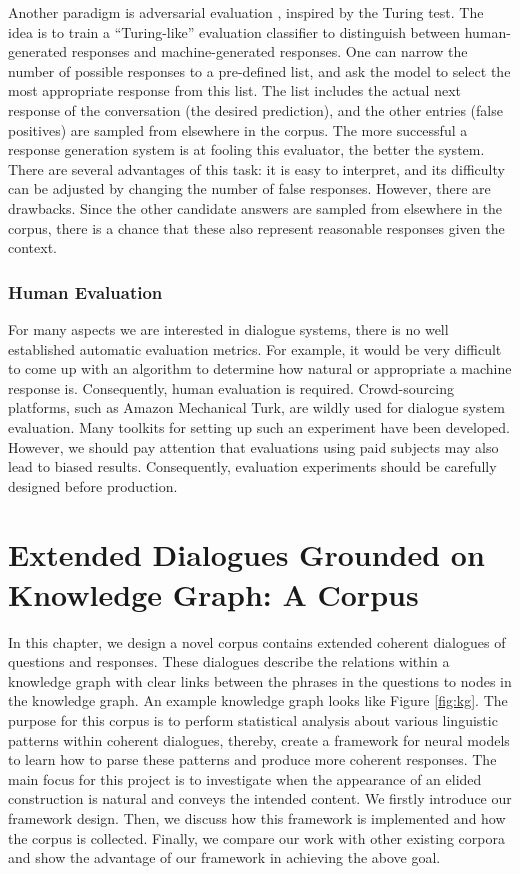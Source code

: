 \documentclass[bsc,frontabs,twoside,singlespacing,parskip,deptreport]{infthesis}     %
\begin{document}
Another paradigm is adversarial evaluation \cite{bowman2015generating,kannan2017adversarial,li2017adversarial}, inspired by the Turing test. The idea is to train a “Turing-like” evaluation classifier to distinguish between human-generated responses and machine-generated responses. One can narrow the number of possible responses to a pre-defined list, and ask the model to select the most appropriate response from this list. The list includes the actual next response of the conversation (the desired prediction), and the other entries (false positives) are sampled from elsewhere in the corpus. The more successful a response generation system is at fooling this evaluator, the better the system. There are several advantages of this task: it is easy to interpret, and its difficulty can be adjusted by changing the number of false responses. However, there are drawbacks. Since the other candidate answers are sampled from elsewhere in the corpus, there is a chance that these also represent reasonable responses given the context. 

\subsection{Human Evaluation}

For many aspects we are interested in dialogue systems, there is no well established automatic evaluation metrics. For example, it would be very difficult to come up with an algorithm to determine how natural or appropriate a machine response is. Consequently, human evaluation is required. Crowd-sourcing platforms, such as Amazon Mechanical Turk\cite{mturk}, are wildly used for dialogue system evaluation. Many toolkits for setting up such an experiment have been developed\cite{lee2018dialcrowd}. However, we should pay attention that evaluations using paid subjects may also lead to biased results\cite{young2013pomdp}. Consequently, evaluation experiments should be carefully designed before production.



\chapter{Extended Dialogues Grounded on Knowledge Graph: A Corpus}

In this chapter, we design a novel corpus contains extended coherent dialogues of questions and responses. These dialogues describe the relations within a knowledge graph with clear links between the phrases in the questions to nodes in the knowledge graph. An example knowledge graph looks like Figure \ref{fig:kg}. The purpose for this corpus is to perform statistical analysis about various linguistic patterns within coherent dialogues, thereby, create a framework for neural models to learn how to parse these patterns and produce more coherent responses. The main focus for this project is to investigate when the appearance of an elided construction is natural and conveys the intended content. We firstly introduce our framework design. Then, we discuss how this framework is implemented and how the corpus is collected. Finally, we compare our work with other existing corpora and show the advantage of our framework in achieving the above goal.
\end{document}
